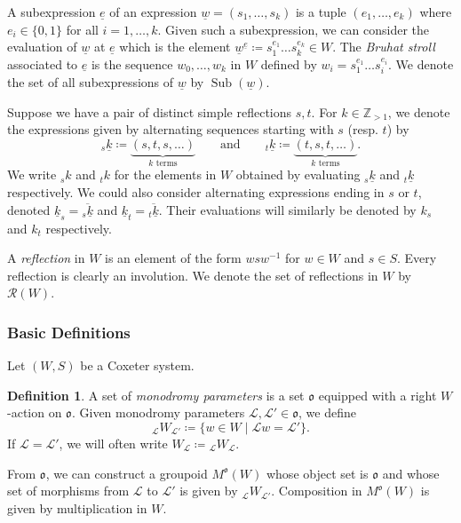 \documentclass{amsart}
\newcommand{\Z}{\mathbb{Z}}
\newcommand{\scrL}{\mathcal{L}}
\newcommand{\fr}[1]{\mathfrak{#1}}
\DeclareMathOperator{\Subexp}{Sub}
\newcommand{\W}[2]{{}_{#1}W_{#2}}
\newcommand{\ue}{\underline{e}}
\newcommand{\uw}{\underline{w}}
\theoremstyle{definition}
\newtheorem{definition}[subsubsection]{Definition}
\numberwithin{equation}{subsection}
\begin{document}
A subexpression $\ue$ of an expression $\uw = (s_1, \ldots, s_k)$ is a tuple $(e_1, \ldots, e_k)$ where $e_i \in \{ 0, 1\}$ for all $i=1,\ldots, k$.
Given such a subexpression, we can consider the evaluation of $\uw$ at $\ue$ which is the element $\uw^{\ue} \coloneq s_1^{e_1} \ldots s_k^{e_k} \in W$.
The \emph{Bruhat stroll} associated to $\ue$ is the sequence $w_0, \ldots, w_k$ in $W$ defined by $w_i = s_1^{e_1} \ldots s_i^{e_i}$.
We denote the set of all subexpressions of $\uw$ by $\Subexp (\uw)$.

Suppose we have a pair of distinct simple reflections $s,t$. 
For $k \in \Z_{> 1}$, we denote the expressions given by alternating sequences starting with $s$ (resp. $t$) by 
\[{}_s \underline{k} \coloneq \underbrace{(s,t,s,\ldots)}_{k\text{ terms}} \qquad \text{and} \qquad {}_t \underline{k} \coloneq \underbrace{(t,s,t,\ldots)}_{k\text{ terms}}.\]
We write ${}_s k$ and ${}_t k$ for the elements in $W$ obtained by evaluating ${}_s \underline{k}$ and ${}_t \underline{k}$ respectively.
We could also consider alternating expressions ending in $s$ or $t$, denoted $\underline{k}_s = \overline{{}_s\underline{k}}$ and $\underline{k}_t = \overline{{}_t\underline{k}}$. Their evaluations will similarly be denoted by $k_s$ and $k_t$ respectively.

A \emph{reflection} in $W$ is an element of the form $wsw^{-1}$ for $w \in W$ and $s\in S$. Every reflection is clearly an involution. We denote the set of reflections in $W$ by $\mathscr{R} (W)$.

\subsubsection{Basic Definitions}

Let $(W,S)$ be a Coxeter system.

\begin{definition}
    A set of \emph{monodromy parameters} is a set $\fr{o}$ equipped with a right $W$-action on $\fr{o}$.
    Given monodromy parameters $\scrL, \scrL' \in \fr{o}$, we define
    \[\W{\scrL}{\scrL'} \coloneq \{w \in W \mid \scrL w = \scrL'\}.\]
    If $\scrL = \scrL'$, we will often write $W_{\scrL} \coloneq \W{\scrL}{\scrL}$.

    From $\fr{o}$, we can construct a groupoid $M^{\fr{o}} (W)$ whose object set is $\fr{o}$ and whose set of morphisms from $\scrL$ to $\scrL'$ is given by $\W{\scrL}{\scrL'}$.
    Composition in $M^{\fr{o}} (W)$ is given by multiplication in $W$.
\end{definition}
\end{document}
